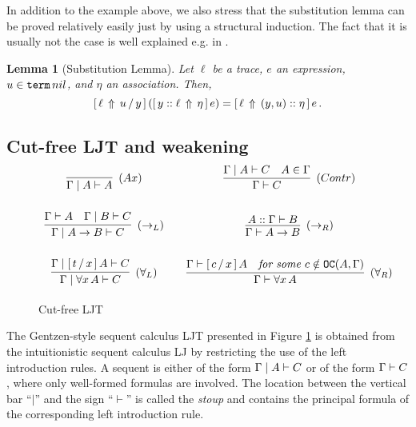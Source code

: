 \documentclass{kms-j}
\theoremstyle{plain}
\newtheorem{lem}[thm]{Lemma}
\theoremstyle{remark}
\begin{document}
In addition to the example above,
we also stress that the substitution lemma can be proved relatively easily just by using a structural
induction. The fact that it is usually not the case is well explained e.g. in \cite{Berghofer2007}.

\begin{lem}[Substitution Lemma]
  Let $\ell$ be a trace,
  $e$ an expression, $u \in \tterm \, nil$, and $\eta$ an
  association. Then,
  \begin{equation*}
    \subst{(\substa{e}{\eta}{y::\ell})}{y}{u}{\ell} =
    \substa{e}{(y,u)::\eta}{\ell}\,.
  \end{equation*}
\end{lem}



\subsection{Cut-free LJT and weakening}

\begin{figure}[t]
$
\begin{array}{c@{\qquad}c}
\seqr{}{\Ga \mid A \vd A}{(Ax)} &
\seqr{\Ga \mid A \vd C & A \in \Ga}{\Ga \vd C}{(Contr)}\\[7ex]

\seqr{\Ga \vd A & \Ga \mid B \vd C}{\Ga \mid A \to B \vd C}{(\to_L)} &
\seqr{A :: \Ga \vd B}{\Ga \vd A\to B}{(\to_R)} \\[7ex]

\seqr{\Ga\mid \substs{A}{x}{t} \vd C}{\Ga\mid \forall x\, A \vd C}{(\forall_L)} &
\seqr{\Ga \vd \substs{A}{x}{c} & \textit{for some } c \notin \tOC(A, \Ga)}{\Ga\vd  \forall x\, A}{(\forall_R)}\\[2ex]
\end{array}
$

\hrulefill
\caption{Cut-free LJT}
\label{ljt}
\end{figure}


The Gentzen-style sequent calculus LJT presented in Figure \ref{ljt} is obtained from the intuitionistic sequent calculus LJ by restricting the use of the left introduction rules.
%
A sequent is either of the form $\Ga\mid A \vd C$ or of the form $\Ga \vd C$,
where only well-formed formulas are involved.
The location between the vertical bar ``$\mid$'' and the sign
``$\vdash$'' is called the {\em stoup}
and contains the principal formula of the corresponding left introduction rule.
\end{document}

